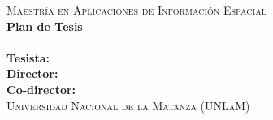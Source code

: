 %
%



\begin{titlepage}

\begin{figure}[h]
\centering
{}
\hspace{5cm}
\end{figure}


\begin{center}
 \leavevmode
    \normalfont
\vspace*{2cm}
     \large \textsc{Maestría en Aplicaciones de Información Espacial}\\
\vspace*{0.5cm}
    \Large \textbf{Plan de Tesis}\\
\vspace*{1cm}
    \Large \textsc{\titulo}
	\\
\vspace*{1cm}
\large \textbf{Tesista: } \autor\\
\vspace*{0.3cm}
\large \textbf{Director: } \director\\
\vspace*{0.3cm}
\large \textbf{Co-director: } \codirector\\
\vspace*{0.3cm}
\vspace*{2cm}
\normalsize
\textsc{Universidad Nacional de la Matanza (UNLaM)}\\


\end{center}
\end{titlepage}
